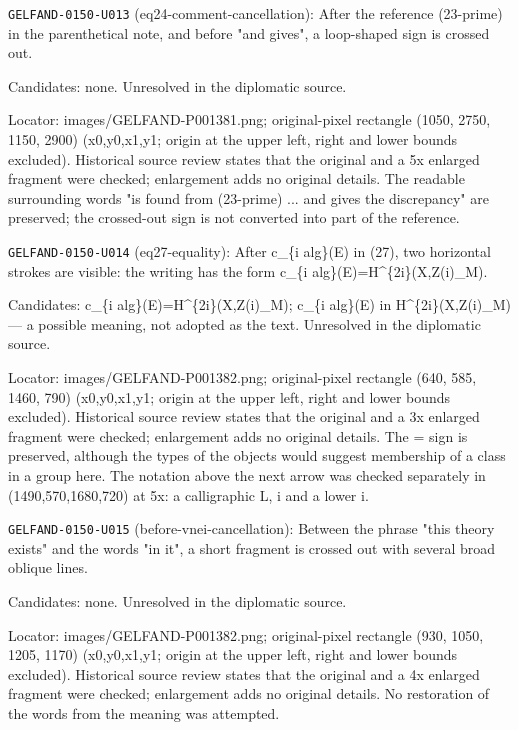 \noindent\texttt{GELFAND-0150-U013} (eq24-comment-cancellation): After the reference (23-prime) in the parenthetical note, and before "and gives", a loop-shaped sign is crossed out.\par
Candidates: none. Unresolved in the diplomatic source.\par
Locator: images/GELFAND-P001381.png; original-pixel rectangle (1050, 2750, 1150, 2900) (x0,y0,x1,y1; origin at the upper left, right and lower bounds excluded). Historical source review states that the original and a 5x enlarged fragment were checked; enlargement adds no original details. The readable surrounding words "is found from (23-prime) ... and gives the discrepancy" are preserved; the crossed-out sign is not converted into part of the reference.\par

\noindent\texttt{GELFAND-0150-U014} (eq27-equality): After c\_\{i alg\}(E) in (27), two horizontal strokes are visible: the writing has the form c\_\{i alg\}(E)=H\textasciicircum{}\{2i\}(X,Z(i)\_M).\par
Candidates: c\_\{i alg\}(E)=H\textasciicircum{}\{2i\}(X,Z(i)\_M); c\_\{i alg\}(E) in H\textasciicircum{}\{2i\}(X,Z(i)\_M) --- a possible meaning, not adopted as the text. Unresolved in the diplomatic source.\par
Locator: images/GELFAND-P001382.png; original-pixel rectangle (640, 585, 1460, 790) (x0,y0,x1,y1; origin at the upper left, right and lower bounds excluded). Historical source review states that the original and a 3x enlarged fragment were checked; enlargement adds no original details. The = sign is preserved, although the types of the objects would suggest membership of a class in a group here. The notation above the next arrow was checked separately in (1490,570,1680,720) at 5x: a calligraphic L, i and a lower i.\par

\noindent\texttt{GELFAND-0150-U015} (before-vnei-cancellation): Between the phrase "this theory exists" and the words "in it", a short fragment is crossed out with several broad oblique lines.\par
Candidates: none. Unresolved in the diplomatic source.\par
Locator: images/GELFAND-P001382.png; original-pixel rectangle (930, 1050, 1205, 1170) (x0,y0,x1,y1; origin at the upper left, right and lower bounds excluded). Historical source review states that the original and a 4x enlarged fragment were checked; enlargement adds no original details. No restoration of the words from the meaning was attempted.\par

